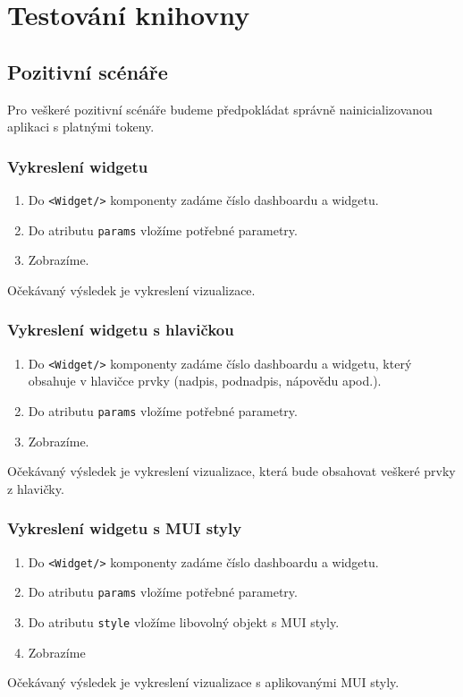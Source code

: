 \documentclass[czech, bc, kiv, he, iso690numb]{fasthesis}
\begin{document}
\section{Testování knihovny}
\subsection{Pozitivní scénáře}
Pro veškeré pozitivní scénáře budeme předpokládat správně nainicializovanou aplikaci s platnými tokeny.
\subsubsection{Vykreslení widgetu}
\begin{enumerate}
	\item Do \texttt{<Widget/>} komponenty zadáme číslo dashboardu a widgetu.
	\item Do atributu \texttt{params} vložíme potřebné parametry.
	\item Zobrazíme.
\end{enumerate}
Očekávaný výsledek je vykreslení vizualizace.

\subsubsection{Vykreslení widgetu s hlavičkou}
\begin{enumerate}
	\item Do \texttt{<Widget/>} komponenty zadáme číslo dashboardu a widgetu, který obsahuje v hlavičce prvky (nadpis, podnadpis, nápovědu apod.).
	\item Do atributu \texttt{params} vložíme potřebné parametry.
	\item Zobrazíme.
\end{enumerate}
Očekávaný výsledek je vykreslení vizualizace, která bude obsahovat veškeré prvky z hlavičky.

\subsubsection{Vykreslení widgetu s MUI styly}
\begin{enumerate}
	\item Do \texttt{<Widget/>} komponenty zadáme číslo dashboardu a widgetu.
	\item Do atributu \texttt{params} vložíme potřebné parametry.
	\item Do atributu \texttt{style} vložíme libovolný objekt s MUI styly.
	\item Zobrazíme
\end{enumerate}
Očekávaný výsledek je vykreslení vizualizace s aplikovanými MUI styly.
\end{document}
